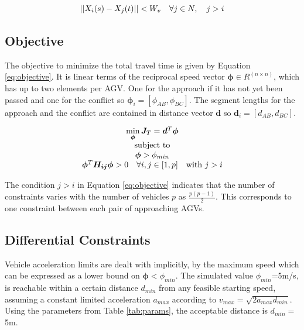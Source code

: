 \begin{equation}
\label{eq:distance_threshold}
||X_i(s) - X_j(t)|| < W_v \quad \forall j \in N, \quad j>i\\
\end{equation}

\subsection{Objective}
The objective to minimize the total travel time is given by Equation \ref{eq:objective}. It is linear terms of the reciprocal speed vector $\bm{\phi} \in R^{(n \times n)}$, which has up to two elements per AGV. One for the approach if it has not yet been passed and one for the conflict so $\bm{\phi}_i = [\phi_{AB}, \phi_{BC}]$. The segment lengths for the approach and the conflict are contained in distance vector $\bm{d}$ so $\bm{d}_i =[d_{AB}, d_{BC}] $.

\begin{equation}
\label{eq:objective}
\begin{array}{c}
\min \limits_{\bm{\phi}} \bm{J}_T = \bm{d}^T\bm{\phi} \\ 
$subject to$\\
\bm{\phi} > \phi_{min} \\
\bm{\phi}^T \bm{H_{ij}} \bm{\phi} > 0 \quad \forall i, j \in [1,p] \quad $with $ j > i \\
\end{array}
\end{equation}

The condition $j > i$ in Equation \ref{eq:objective} indicates that the number of constraints varies with the number of vehicles $p$ as $\frac{p(p-1)}{2}$. This corresponds to one constraint between each pair of approaching AGVs.

\subsection{Differential Constraints}
Vehicle acceleration limits are dealt with implicitly, by the maximum speed which can be expressed as a lower bound on $\bm{\phi} < \phi_{min}$. The simulated value $\phi_{min}$=5m/s, is reachable within a certain distance $d_{min}$ from any feasible starting speed, assuming a constant limited acceleration $a_{max}$ according to $v_{max} = \sqrt{2 a_{max} d_{min}} $. Using the parameters from Table \ref{tab:params}, the acceptable distance is $d_{min}=$5m.


